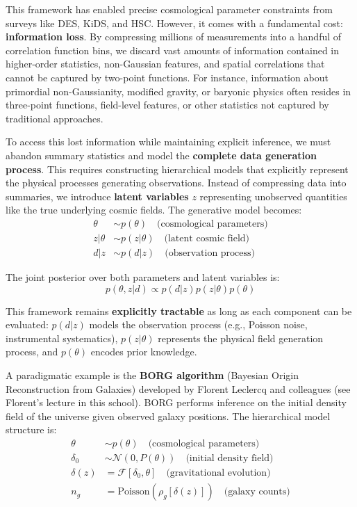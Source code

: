 \documentclass[11pt,a4paper]{article}
\theoremstyle{definition}
\begin{document}
This framework has enabled precise cosmological parameter constraints from surveys like DES, KiDS, and HSC. However, it comes with a fundamental cost: \textbf{information loss}. By compressing millions of measurements into a handful of correlation function bins, we discard vast amounts of information contained in higher-order statistics, non-Gaussian features, and spatial correlations that cannot be captured by two-point functions. For instance, information about primordial non-Gaussianity, modified gravity, or baryonic physics often resides in three-point functions, field-level features, or other statistics not captured by traditional approaches.

To access this lost information while maintaining explicit inference, we must abandon summary statistics and model the \textbf{complete data generation process}. This requires constructing hierarchical models that explicitly represent the physical processes generating observations. Instead of compressing data into summaries, we introduce \textbf{latent variables} $z$ representing unobserved quantities like the true underlying cosmic fields. The generative model becomes:
\begin{align}
    \theta &\sim p(\theta) \quad \text{(cosmological parameters)} \\
    z|\theta &\sim p(z|\theta) \quad \text{(latent cosmic field)} \\
    d|z &\sim p(d|z) \quad \text{(observation process)}
\end{align}

The joint posterior over both parameters and latent variables is:
\begin{equation}
    p(\theta, z|d) \propto p(d|z)p(z|\theta)p(\theta)
\end{equation}

This framework remains \textbf{explicitly tractable} as long as each component can be evaluated: $p(d|z)$ models the observation process (e.g., Poisson noise, instrumental systematics), $p(z|\theta)$ represents the physical field generation process, and $p(\theta)$ encodes prior knowledge.

A paradigmatic example is the \textbf{BORG algorithm} (Bayesian Origin Reconstruction from Galaxies) developed by Florent Leclercq and colleagues (see Florent's lecture in this school). BORG performs inference on the initial density field of the universe given observed galaxy positions. The hierarchical model structure is:
\begin{align}
    \theta &\sim p(\theta) \quad \text{(cosmological parameters)} \\
    \delta_0 &\sim \mathcal{N}(0, P(\theta)) \quad \text{(initial density field)} \\
    \delta(z) &= \mathcal{F}[\delta_0, \theta] \quad \text{(gravitational evolution)} \\
    n_g &= \text{Poisson}(\rho_g[\delta(z)]) \quad \text{(galaxy counts)}
\end{align}
\end{document}
